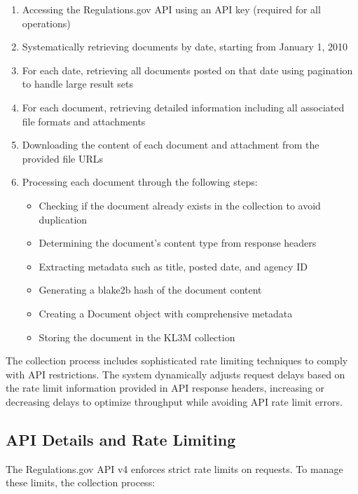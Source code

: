 \begin{enumerate}
    \item Accessing the Regulations.gov API using an API key (required for all operations)
    \item Systematically retrieving documents by date, starting from January 1, 2010
    \item For each date, retrieving all documents posted on that date using pagination to handle large result sets
    \item For each document, retrieving detailed information including all associated file formats and attachments
    \item Downloading the content of each document and attachment from the provided file URLs
    \item Processing each document through the following steps:
    \begin{itemize}
        \item Checking if the document already exists in the collection to avoid duplication
        \item Determining the document's content type from response headers
        \item Extracting metadata such as title, posted date, and agency ID
        \item Generating a blake2b hash of the document content
        \item Creating a Document object with comprehensive metadata
        \item Storing the document in the KL3M collection
    \end{itemize}
\end{enumerate}

The collection process includes sophisticated rate limiting techniques to comply with API restrictions. The system dynamically adjusts request delays based on the rate limit information provided in API response headers, increasing or decreasing delays to optimize throughput while avoiding API rate limit errors.

\subsection{API Details and Rate Limiting}

The Regulations.gov API v4 enforces strict rate limits on requests. To manage these limits, the collection process:

